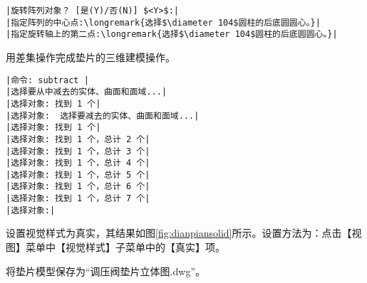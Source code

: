 \begin{procedure}
\begin{lstlisting}
|旋转阵列对象？ [是(Y)/否(N)] $<Y>$:|
|指定阵列的中心点:\longremark{选择$\diameter 104$圆柱的后底圆圆心。}|
|指定旋转轴上的第二点:\longremark{选择$\diameter 104$圆柱的后底圆圆心。}|
\end{lstlisting}
\showremarks
\item 用差集操作完成垫片的三维建模操作。
\begin{lstlisting}
|命令: subtract |
|选择要从中减去的实体、曲面和面域...|
|选择对象: 找到 1 个|
|选择对象:  选择要减去的实体、曲面和面域...|
|选择对象: 找到 1 个|
|选择对象: 找到 1 个，总计 2 个|
|选择对象: 找到 1 个，总计 3 个|
|选择对象: 找到 1 个，总计 4 个|
|选择对象: 找到 1 个，总计 5 个|
|选择对象: 找到 1 个，总计 6 个|
|选择对象: 找到 1 个，总计 7 个|
|选择对象:|
\end{lstlisting}
\item 设置视觉样式为真实，其结果如图\ref{fig:dianpiansolid}所示。设置方法为：点击【视图】菜单中【视觉样式】子菜单中的【真实】项。
\item 将垫片模型保存为“调压阀垫片立体图.dwg”。
\end{procedure}